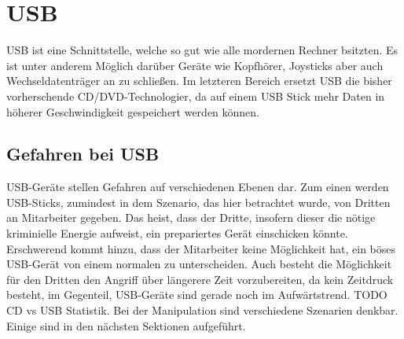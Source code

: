 \chapter{USB}
USB ist eine Schnittstelle, welche so gut wie alle mordernen Rechner bsitzten. Es ist unter anderem Möglich darüber Geräte wie Kopfhörer, Joysticks aber auch Wechseldatenträger an zu schließen. Im letzteren Bereich ersetzt USB die bisher vorherschende CD/DVD-Technologier, da auf einem USB Stick mehr Daten in höherer Geschwindigkeit gespeichert werden können.

\section{Gefahren bei USB}\label{GefBeiUSB}
USB-Geräte stellen Gefahren auf verschiedenen Ebenen dar. Zum einen werden USB-Sticks, zumindest in dem Szenario, das hier betrachtet wurde, von Dritten an Mitarbeiter gegeben. Das heist, dass der Dritte, insofern dieser die nötige kriminielle Energie aufweist, ein prepariertes Gerät einschicken könnte. Erschwerend kommt hinzu, dass der Mitarbeiter keine Möglichkeit hat, ein böses USB-Gerät von einem normalen zu unterscheiden. Auch besteht die Möglichkeit für den Dritten den Angriff über längerere Zeit vorzubereiten, da kein Zeitdruck besteht, im Gegenteil, USB-Geräte sind gerade noch im Aufwärtstrend. TODO CD vs USB Statistik. Bei der Manipulation sind verschiedene Szenarien denkbar. Einige sind in den nächsten Sektionen aufgeführt.

